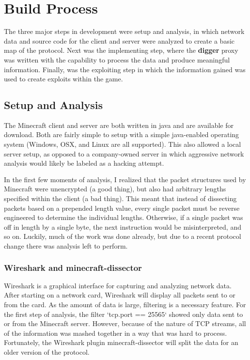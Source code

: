 \documentclass[12pt]{article}
\begin{document}
\section{Build Process}
The three major steps in development were setup and analysis, in which network data and source code for the client and server were analyzed to create a basic map of the protocol. Next was the implementing step, where the \textbf{digger} proxy was written with the capability to process the data and produce meaningful information. Finally, was the exploiting step in which the information gained was used to create exploits within the game.

\subsection{Setup and Analysis}
The Minecraft client and server are both written in java and are available for download. Both are fairly simple to setup with a simple java-enabled operating system (Windows, OSX, and Linux are all supported).  This also allowed a local server setup, as opposed to a company-owned server in which aggressive network analysis would likely be labeled as a hacking attempt.

In the first few moments of analysis, I realized that the packet structures used by Minecraft were unencrypted (a good thing), but also had arbitrary lengths specified within the client (a bad thing). This meant that instead of dissecting packets based on a prepended length value, every single packet must be reverse engineered to determine the individual lengths. Otherwise, if a single packet was off in length by a single byte, the next instruction would be misinterpreted, and so on. Luckily, much of the work was done already, but due to a recent protocol change there was analysis left to perform.

\subsubsection{Wireshark and minecraft-dissector}
Wireshark is a graphical interface for capturing and analyzing network data. After starting on a network card, Wireshark will display all packets sent to or from the card. As the amount of data is large, filtering is a necessary feature. For the first step of analysis, the filter `tcp.port == 25565` showed only data sent to or from the Minecraft server. However, because of the nature of TCP streams, all of the information was mashed together in a way that was hard to process. Fortunately, the Wireshark plugin minecraft-dissector will split the data for an older version of the protocol.
\end{document}
